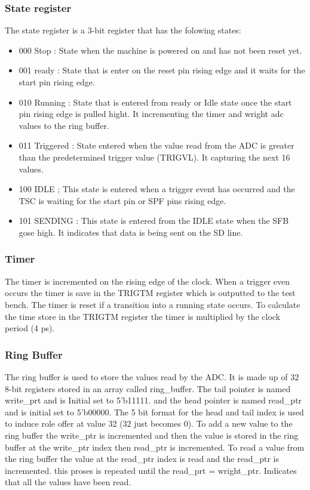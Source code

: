 \subsubsection{State register}
The state register is a 3-bit register that has the folowing states:
\begin{itemize}
      \item 000 Stop :
            State when the machine is powered on and has not been reset yet.
      \item 001 ready :
            State that is enter on the reset pin rising edge and it waits for the start pin rising edge.
      \item 010 Running :
            State that is entered from ready or Idle state once the start pin rising edge is pulled hight.
            It incrementing the timer and wright adc values to the ring buffer.
      \item 011 Triggered :
            State entered when the value read from the ADC is
            greater than the predetermined trigger value (TRIGVL).
            It capturing the next 16 values.
      \item 100 IDLE ;
            This state is entered when a trigger event has occurred
            and the TSC is waiting for the start pin or SPF pins rising edge.
      \item 101 SENDING :
            This state is entered from the IDLE state when the SFB gose high. It indicates that data is being sent on the SD line.
\end{itemize}


\subsubsection{Timer}
The timer is incremented on the rising edge of the clock. When
a trigger even occurs the timer is save in the TRIGTM register which is outputted to the test bench.
The timer is reset if a transition into a running state occurs.
To calculate the time store in the TRIGTM register the timer is multiplied by the clock period (4 ps).



\subsubsection{Ring Buffer}
The ring buffer is used to store the values read by the ADC.
It is made up of 32 8-bit registers stored in an array called ring\_buffer.
The tail pointer is named write\_prt and is Initial set to 5'b11111.
and the head pointer is named read\_ptr and is initial set to 5'b00000.
The 5 bit format for the head and tail index is used to induce role offer at value 32 (32 just becomes 0).
To add a new value to the ring buffer the write\_ptr is incremented and then the
value is stored in the ring buffer at the write\_ptr index then read\_ptr is incremented.
To read a value from the ring buffer the value at the read\_ptr index is read and the read\_ptr is incremented.
this proses is repeated until the read\_prt = wright\_ptr. Indicates that all the values have been read.

